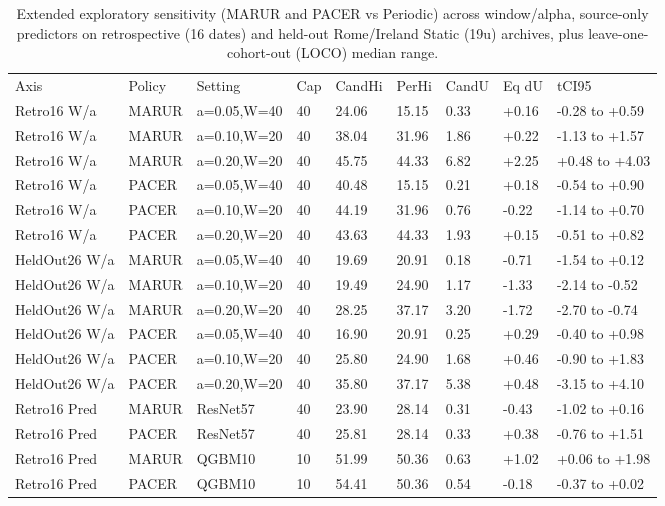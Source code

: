 \begin{table}[!ht]
\centering\footnotesize\setlength{\tabcolsep}{3.5pt}
\caption{Extended exploratory sensitivity (MARUR and PACER vs Periodic) across window/alpha, source-only predictors on retrospective (16 dates) and held-out Rome/Ireland Static (19u) archives, plus leave-one-cohort-out (LOCO) median range.}
\begin{tabular}{lllllllll}
\hline
Axis & Policy & Setting & Cap & CandHi & PerHi & CandU & Eq dU & tCI95 \\
Retro16 W/a & MARUR & a=0.05,W=40 & 40 & 24.06 & 15.15 & 0.33 & +0.16 & -0.28 to +0.59 \\
Retro16 W/a & MARUR & a=0.10,W=20 & 40 & 38.04 & 31.96 & 1.86 & +0.22 & -1.13 to +1.57 \\
Retro16 W/a & MARUR & a=0.20,W=20 & 40 & 45.75 & 44.33 & 6.82 & +2.25 & +0.48 to +4.03 \\
Retro16 W/a & PACER & a=0.05,W=40 & 40 & 40.48 & 15.15 & 0.21 & +0.18 & -0.54 to +0.90 \\
Retro16 W/a & PACER & a=0.10,W=20 & 40 & 44.19 & 31.96 & 0.76 & -0.22 & -1.14 to +0.70 \\
Retro16 W/a & PACER & a=0.20,W=20 & 40 & 43.63 & 44.33 & 1.93 & +0.15 & -0.51 to +0.82 \\
HeldOut26 W/a & MARUR & a=0.05,W=40 & 40 & 19.69 & 20.91 & 0.18 & -0.71 & -1.54 to +0.12 \\
HeldOut26 W/a & MARUR & a=0.10,W=20 & 40 & 19.49 & 24.90 & 1.17 & -1.33 & -2.14 to -0.52 \\
HeldOut26 W/a & MARUR & a=0.20,W=20 & 40 & 28.25 & 37.17 & 3.20 & -1.72 & -2.70 to -0.74 \\
HeldOut26 W/a & PACER & a=0.05,W=40 & 40 & 16.90 & 20.91 & 0.25 & +0.29 & -0.40 to +0.98 \\
HeldOut26 W/a & PACER & a=0.10,W=20 & 40 & 25.80 & 24.90 & 1.68 & +0.46 & -0.90 to +1.83 \\
HeldOut26 W/a & PACER & a=0.20,W=20 & 40 & 35.80 & 37.17 & 5.38 & +0.48 & -3.15 to +4.10 \\
Retro16 Pred & MARUR & ResNet57 & 40 & 23.90 & 28.14 & 0.31 & -0.43 & -1.02 to +0.16 \\
Retro16 Pred & PACER & ResNet57 & 40 & 25.81 & 28.14 & 0.33 & +0.38 & -0.76 to +1.51 \\
Retro16 Pred & MARUR & QGBM10 & 10 & 51.99 & 50.36 & 0.63 & +1.02 & +0.06 to +1.98 \\
Retro16 Pred & PACER & QGBM10 & 10 & 54.41 & 50.36 & 0.54 & -0.18 & -0.37 to +0.02 \\

\end{tabular}
\end{table}
